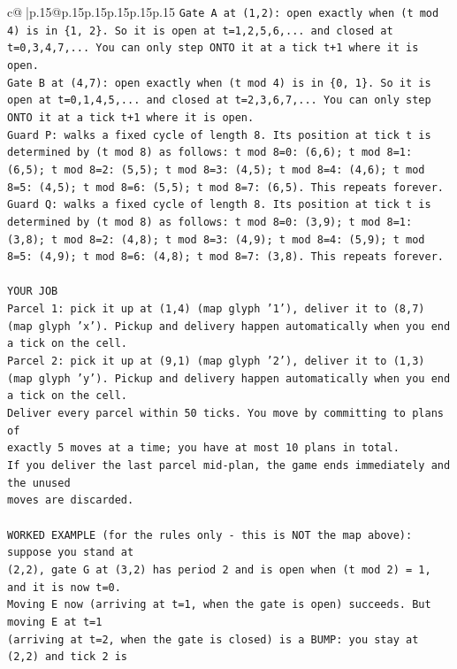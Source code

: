 \documentclass{article}
\begin{document}
{\begin{supertabular}{c@{$\;$}|p{.15\linewidth}@{}p{.15\linewidth}p{.15\linewidth}p{.15\linewidth}p{.15\linewidth}p{.15\linewidth}}
{{{\texttt{Gate A at (1,2): open exactly when (t mod 4) is in \{1, 2\}. So it is open at t=1,2,5,6,... and closed at t=0,3,4,7,... You can only step ONTO it at a tick t+1 where it is open.} \\
\texttt{Gate B at (4,7): open exactly when (t mod 4) is in \{0, 1\}. So it is open at t=0,1,4,5,... and closed at t=2,3,6,7,... You can only step ONTO it at a tick t+1 where it is open.} \\
\texttt{Guard P: walks a fixed cycle of length 8. Its position at tick t is determined by (t mod 8) as follows: t mod 8=0: (6,6); t mod 8=1: (6,5); t mod 8=2: (5,5); t mod 8=3: (4,5); t mod 8=4: (4,6); t mod 8=5: (4,5); t mod 8=6: (5,5); t mod 8=7: (6,5). This repeats forever.} \\
\texttt{Guard Q: walks a fixed cycle of length 8. Its position at tick t is determined by (t mod 8) as follows: t mod 8=0: (3,9); t mod 8=1: (3,8); t mod 8=2: (4,8); t mod 8=3: (4,9); t mod 8=4: (5,9); t mod 8=5: (4,9); t mod 8=6: (4,8); t mod 8=7: (3,8). This repeats forever.} \\
\\ 
\texttt{YOUR JOB} \\
\texttt{Parcel 1: pick it up at (1,4) (map glyph '1'), deliver it to (8,7) (map glyph 'x'). Pickup and delivery happen automatically when you end a tick on the cell.} \\
\texttt{Parcel 2: pick it up at (9,1) (map glyph '2'), deliver it to (1,3) (map glyph 'y'). Pickup and delivery happen automatically when you end a tick on the cell.} \\
\texttt{Deliver every parcel within 50 ticks. You move by committing to plans of} \\
\texttt{exactly 5 moves at a time; you have at most 10 plans in total.} \\
\texttt{If you deliver the last parcel mid{-}plan, the game ends immediately and the unused} \\
\texttt{moves are discarded.} \\
\\ 
\texttt{WORKED EXAMPLE (for the rules only {-} this is NOT the map above): suppose you stand at} \\
\texttt{(2,2), gate G at (3,2) has period 2 and is open when (t mod 2) = 1, and it is now t=0.} \\
\texttt{Moving E now (arriving at t=1, when the gate is open) succeeds. But moving E at t=1} \\
\texttt{(arriving at t=2, when the gate is closed) is a BUMP: you stay at (2,2) and tick 2 is} \\
}}}
\end{supertabular}}
\end{document}
